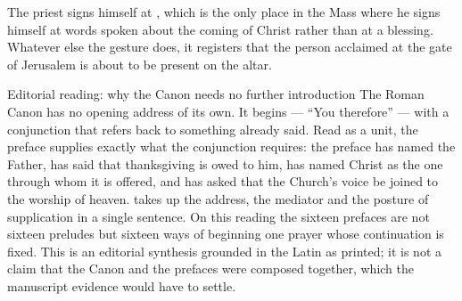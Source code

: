 The priest signs himself at , which is the only
place in the Mass where he signs himself at words spoken about the coming of
Christ rather than at a blessing. Whatever else the gesture does, it registers
that the person acclaimed at the gate of Jerusalem is about to be present on
the altar.

\begin{proposal}{Editorial reading: why the Canon needs no further introduction}
The Roman Canon has no opening address of its own. It begins  --- ``You therefore'' --- with a conjunction that refers back to
something already said. Read as a unit, the preface supplies exactly what the
conjunction requires: the preface has named the Father, has said that
thanksgiving is owed to him, has named Christ as the one through whom it is
offered, and has asked that the Church's voice be joined to the worship of
heaven.  takes up the address, the mediator
and the posture of supplication in a single sentence. On this reading the
sixteen prefaces are not sixteen preludes but sixteen ways of beginning one
prayer whose continuation is fixed. This is an editorial synthesis grounded in
the Latin as printed; it is not a claim that the Canon and the prefaces were
composed together, which the manuscript evidence would have to settle.
\end{proposal}
